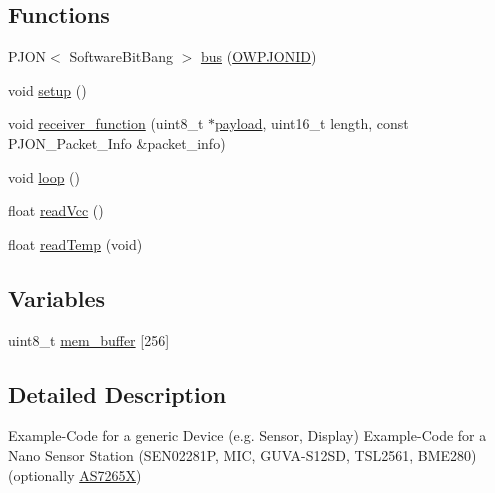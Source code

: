 \subsection*{Functions}
\begin{DoxyCompactItemize}
\item 
P\-J\-O\-N$<$ Software\-Bit\-Bang $>$ \hyperlink{ARDUINO_2Local_2SoftwareBitBang_2DeviceGeneric_2DeviceGeneric_8ino_a5b555b33c74db25f14ae6a0906d55596}{bus} (\hyperlink{OWP__DG__Si7021__thermo-hygrometer_8ino_aff6283040066cbe0e6d17cbcd83abffc}{O\-W\-P\-J\-O\-N\-I\-D})
\item 
void \hyperlink{ARDUINO_2Local_2SoftwareBitBang_2DeviceGeneric_2DeviceGeneric_8ino_a4fc01d736fe50cf5b977f755b675f11d}{setup} ()
\item 
void \hyperlink{ARDUINO_2Local_2SoftwareBitBang_2DeviceGeneric_2DeviceGeneric_8ino_a76fc5e73c141f748dcc1809fdcfa1714}{receiver\-\_\-function} (uint8\-\_\-t $\ast$\hyperlink{Uno__Dragino__LoRa__GPS__Shield__TTN_8ino_a78a402d1762842473567de90b11ed256}{payload}, uint16\-\_\-t length, const P\-J\-O\-N\-\_\-\-Packet\-\_\-\-Info \&packet\-\_\-info)
\item 
void \hyperlink{ARDUINO_2Local_2SoftwareBitBang_2DeviceGeneric_2DeviceGeneric_8ino_afe461d27b9c48d5921c00d521181f12f}{loop} ()
\item 
float \hyperlink{ARDUINO_2Local_2SoftwareBitBang_2DeviceGeneric_2DeviceGeneric_8ino_a0b3195c3893f02cb1b80d878b89549d6}{read\-Vcc} ()
\item 
float \hyperlink{ARDUINO_2Local_2SoftwareBitBang_2DeviceGeneric_2DeviceGeneric_8ino_ada109bb0cdc12131465dfe7a74f93b1e}{read\-Temp} (void)
\end{DoxyCompactItemize}
\subsection*{Variables}
\begin{DoxyCompactItemize}
\item 
uint8\-\_\-t \hyperlink{ARDUINO_2Local_2SoftwareBitBang_2DeviceGeneric_2DeviceGeneric_8ino_a02235b4e96743403348a58d554caa3dc}{mem\-\_\-buffer} \mbox{[}256\mbox{]}
\end{DoxyCompactItemize}


\subsection{Detailed Description}
Example-\/\-Code for a generic Device (e.\-g. Sensor, Display) Example-\/\-Code for a Nano Sensor Station (S\-E\-N02281\-P, M\-I\-C, G\-U\-V\-A-\/\-S12\-S\-D, T\-S\-L2561, B\-M\-E280) (optionally \hyperlink{classAS7265X}{A\-S7265\-X})

